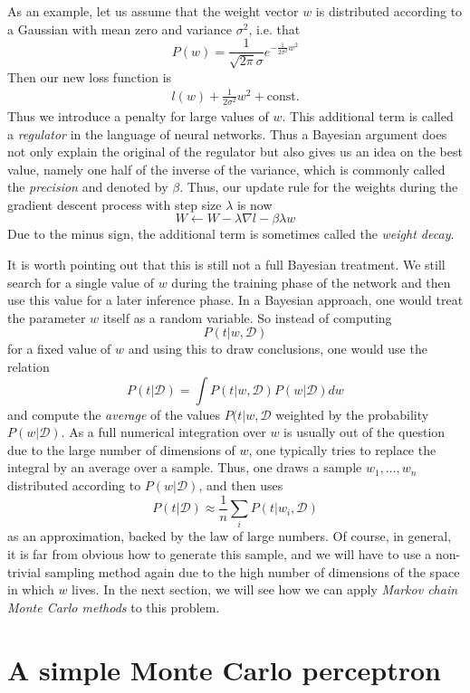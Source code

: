\documentclass[a4paper, draft]{report}
\numberwithin{section}{chapter}
\numberwithin{equation}{chapter}
\theoremstyle{own}
\theoremstyle{remark}
\begin{document}
As an example, let us assume that the weight vector $w$ is distributed according to a Gaussian with mean zero and variance $\sigma^2$, i.e. that
$$
P(w) = \frac{1}{\sqrt{2\pi}\sigma} e^{-\frac{1}{2\sigma^2} w^2}
$$
Then our new loss function is
\begin{align}\label{eq:lossfunctionwithpenalty}
l(w) + \frac{1}{2\sigma^2} w^2 + \text{const.}
\end{align}
Thus we introduce a penalty for large values of $w$. This additional term is called a {\em regulator} in the language of neural networks. Thus a Bayesian argument does not only explain the original of the regulator but also gives us an idea on the best value, namely one half of the 
inverse of the variance, which is commonly called the {\em precision} and denoted by $\beta$. Thus, our update rule for the weights during the gradient descent process with step size $\lambda$ is now
$$
W \leftarrow W - \lambda \nabla l - \beta \lambda w
$$
Due to the minus sign, the additional term is sometimes called the {\em weight decay}. 

It is worth pointing out that this is still not a full Bayesian treatment. We still search for a single value of $w$ during the training phase of the network and then use this value for a later inference phase. In a Bayesian approach, one would treat the parameter $w$ itself as a random variable. So instead of computing
$$
P(t | w,{\mathcal D})
$$
for a fixed value of $w$ and using this to draw conclusions, one would use the relation
$$
P(t |{\mathcal D}) = \int P(t | w,{\mathcal D}) P(w | {\mathcal D}) dw
$$
and compute the {\em average} of the values $P(t | w,{\mathcal D}$ weighted by the probability $P(w | {\mathcal D})$. As a full numerical integration over $w$ is usually out of the question due to the large number of dimensions of $w$, one typically tries to replace the integral by an average over a sample. Thus, one draws a sample $w_1, \dots, w_n$ distributed according to $P(w | {\mathcal D})$, and then uses
$$
P(t |{\mathcal D}) \approx \frac{1}{n} \sum_i P(t | w_i,{\mathcal D})
$$
as an approximation, backed by the law of large numbers. Of course, in general, it is far from obvious how to generate this sample, and we will have to use a non-trivial sampling method again due to the high number of dimensions of the space in which $w$ lives. In the next section, we will see how we can apply {\em Markov chain Monte Carlo methods} to this problem.


\chapter{A simple Monte Carlo perceptron}\label{chap:MCPerceptron}
\end{document}
